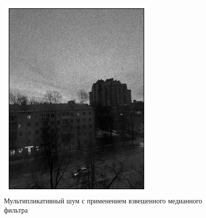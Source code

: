 \documentclass[a4paper,12pt]{article}
\begin{document}
\begin{figure}[H]
\begin{minipage}{0.49\textwidth}
        \centering \includegraphics[width=\textwidth]{results/nlf_speckle_2.png}
        \caption{Мультипликативный шум с применением взвешенного медианного фильтра}
    \end{minipage}
\end{figure}
\end{document}
